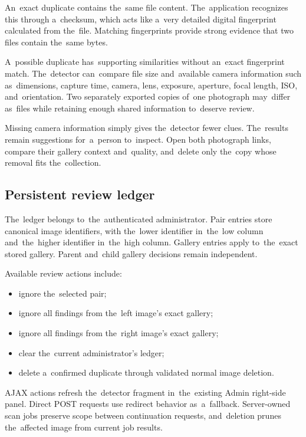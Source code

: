 \documentclass[11pt,a4paper]{article}
\begin{document}
An~exact duplicate contains the~same file content. The~application recognizes
this through a~checksum, which acts like a~very detailed digital fingerprint
calculated from the~file. Matching fingerprints provide strong evidence that two
files contain the~same bytes.

A~possible duplicate has~supporting similarities without an~exact fingerprint
match. The~detector can~compare file size and~available camera information such
as~dimensions, capture time, camera, lens, exposure, aperture, focal length,
ISO, and~orientation. Two separately exported copies of~one photograph
may~differ as~files while retaining enough shared information to~deserve review.

Missing camera information simply gives the~detector fewer clues. The~results
remain suggestions for~a~person to~inspect. Open both photograph links, compare
their gallery context and~quality, and~delete only the~copy whose removal fits
the~collection.

\subsection{Persistent review ledger}

The~ledger belongs to~the~authenticated administrator. Pair entries store
canonical image identifiers, with the~lower identifier in~the~low column
and~the~higher identifier in~the~high column. Gallery entries apply to~the~exact
stored gallery. Parent and~child gallery decisions remain independent.

Available review actions include:

\begin{itemize}
  \item ignore the~selected pair;
  \item ignore all findings from the~left image's exact gallery;
  \item ignore all findings from the~right image's exact gallery;
  \item clear the~current administrator's ledger;
  \item delete a~confirmed duplicate through validated normal image deletion.
\end{itemize}

AJAX actions refresh the~detector fragment in~the~existing Admin right-side
panel. Direct POST requests use redirect behavior as~a~fallback. Server-owned
scan jobs preserve scope between continuation requests, and~deletion prunes
the~affected image from current job results.
\end{document}
